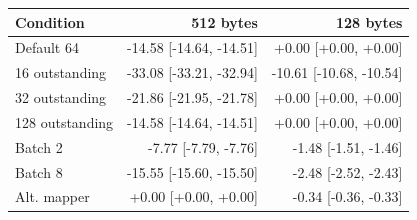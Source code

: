 \begin{tabular}{lrr}
\toprule
Condition & 512 bytes & 128 bytes \\
\midrule
Default 64 & -14.58 [-14.64, -14.51] & +0.00 [+0.00, +0.00] \\
16 outstanding & -33.08 [-33.21, -32.94] & -10.61 [-10.68, -10.54] \\
32 outstanding & -21.86 [-21.95, -21.78] & +0.00 [+0.00, +0.00] \\
128 outstanding & -14.58 [-14.64, -14.51] & +0.00 [+0.00, +0.00] \\
Batch 2 & -7.77 [-7.79, -7.76] & -1.48 [-1.51, -1.46] \\
Batch 8 & -15.55 [-15.60, -15.50] & -2.48 [-2.52, -2.43] \\
Alt. mapper & +0.00 [+0.00, +0.00] & -0.34 [-0.36, -0.33] \\
\bottomrule
\end{tabular}
